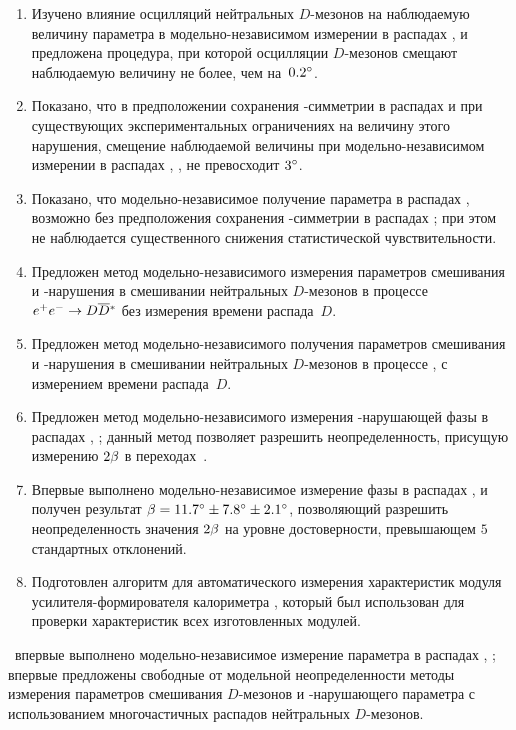 %
\begin{enumerate}
  \item Изучено влияние осцилляций нейтральных $D$-мезонов на наблюдаемую величину параметра \gphi в модельно-независимом измерении в распадах \bdk, \dkpp и предложена процедура, при которой осцилляции $D$-мезонов смещают наблюдаемую величину не более, чем на~$0.2^{\circ}$.
  \item Показано, что в предположении сохранения \cpconj-симметрии в распадах \dnkpp и при существующих экспериментальных ограничениях на величину этого нарушения, смещение наблюдаемой величины \gphi при модельно-независимом измерении в распадах \bdk, \dkpp, не превосходит $3^{\circ}$.
  \item Показано, что модельно-независимое получение параметра \gphi в распадах \bdk, \dkpp возможно без предположения сохранения \cpconj-симметрии в распадах \dnkpp; при этом не наблюдается существенного снижения статистической чувствительности.
  \item Предложен метод модельно-независимого измерения параметров смешивания и \cpconj-нарушения в смешивании нейтральных $D$-мезонов в процессе $e^+e^-\to D\overline{D}{}^{*}$ без измерения времени распада~$D$.
  \item Предложен метод модельно-независимого получения параметров смешивания и \cpconj-нарушения в смешивании нейтральных $D$-мезонов в процессе \dstpdpip, \dnkpp с измерением времени распада~$D$.
  \item Предложен метод модельно-независимого измерения \cpconj-нарушающей фазы \pphi в распадах \bdsth, \dbkpp; данный метод позволяет разрешить неопределенность, присущую измерению $2\beta$ в переходах~\btoccs.
  \item Впервые выполнено модельно-независимое измерение фазы \pphi в распадах \bdsth, \dbkpp и получен результат $\beta = 11.7^{\circ}\pm7.8^{\circ}\pm2.1^{\circ}$, позволяющий разрешить неопределенность значения $2\beta$ на уровне достоверности, превышающем $5$ стандартных отклонений.
  \item Подготовлен алгоритм для автоматического измерения характеристик модуля усилителя-формирователя калориметра \belleii, который был использован для проверки характеристик всех изготовленных модулей.
\end{enumerate}

\novelty\ впервые выполнено модельно-независимое измерение параметра \pphi в распадах \bdsth, \dbkpp; впервые предложены свободные от модельной неопределенности методы измерения параметров смешивания $D$-мезонов и \cpconj-нарушающего параметра \pphi с использованием многочастичных распадов нейтральных $D$-мезонов.

